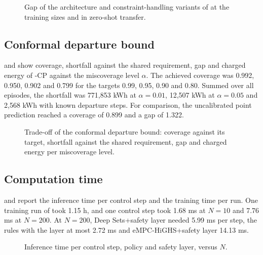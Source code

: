 \begin{figure}[t]
\centering
{}
\caption{Gap of the architecture and constraint-handling variants of  at the training sizes and in zero-shot transfer.}
\label{fig:ablation}
\end{figure}


\subsection{Conformal departure bound}\label{app:res-conformal}

 and  show coverage, shortfall against the shared requirement, gap and charged energy of \method{}-CP against the miscoverage level $\alpha$.
The achieved coverage was 0.992, 0.950, 0.902 and 0.799 for the targets 0.99, 0.95, 0.90 and 0.80.
Summed over all episodes, the shortfall was 771,853 kWh at $\alpha=0.01$, 12,507 kWh at $\alpha=0.05$ and 2,568 kWh with known departure steps.
For comparison, the uncalibrated point prediction reached a coverage of 0.899 and a gap of 1.322.

\begin{figure}[t]
\centering
{}
\caption{Trade-off of the conformal departure bound: coverage against its target, shortfall against the shared requirement, gap and charged energy per miscoverage level.}
\label{fig:conformal}
\end{figure}


\subsection{Computation time}\label{app:res-time}

 and  report the inference time per control step and the training time per run.
One training run of \method{} took 1.15 h, and one control step took 1.68 ms at $N=10$ and 7.76 ms at $N=200$.
At $N=200$, Deep Sets+safety layer needed 5.99 ms per step, the rules with the layer at most 2.72 ms and eMPC-HiGHS+safety layer 14.13 ms.

\begin{figure}[t]
\centering
{}
\caption{Inference time per control step, policy and safety layer, versus $N$.}
\label{fig:inference}
\end{figure}

